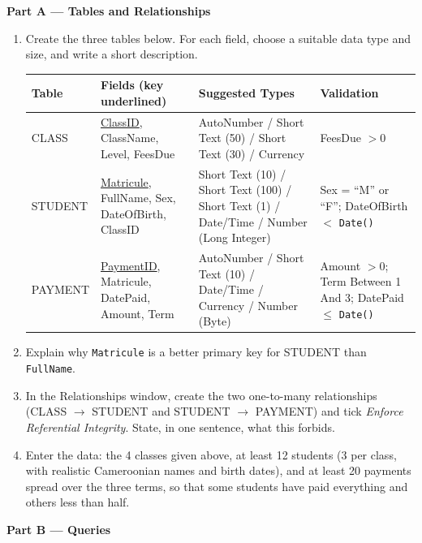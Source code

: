 \documentclass[11pt]{article}
\newcommand{\cle}[1]{{\popxbold\color{popdark}#1}}
\begin{document}
\textbf{Part A — Tables and Relationships}

\begin{enumerate}
\item Create the three tables below. For each field, choose a suitable data type and size, and write a short description.
\begin{center}
\begin{tabularx}{\linewidth}{|l|X|X|X|}
\hline
\rowcolor{popblueL} \textbf{Table} & \textbf{Fields (key underlined)} & \textbf{Suggested Types} & \textbf{Validation} \\
\hline
CLASS & \underline{ClassID}, ClassName, Level, FeesDue & AutoNumber / Short Text (50) / Short Text (30) / Currency & FeesDue $> 0$ \\
\hline
STUDENT & \underline{Matricule}, FullName, Sex, DateOfBirth, ClassID & Short Text (10) / Short Text (100) / Short Text (1) / Date/Time / Number (Long Integer) & Sex = ``M'' or ``F''; DateOfBirth $<$ \texttt{Date()} \\
\hline
PAYMENT & \underline{PaymentID}, Matricule, DatePaid, Amount, Term & AutoNumber / Short Text (10) / Date/Time / Currency / Number (Byte) & Amount $> 0$; Term Between 1 And 3; DatePaid $\le$ \texttt{Date()} \\
\hline
\end{tabularx}
\end{center}

\item Explain why \texttt{Matricule} is a better primary key for STUDENT than \texttt{FullName}.
\item In the Relationships window, create the two \cle{one-to-many} relationships (CLASS $\rightarrow$ STUDENT and STUDENT $\rightarrow$ PAYMENT) and tick \emph{Enforce Referential Integrity}. State, in one sentence, what this forbids.
\item Enter the data: the 4 classes given above, at least 12 students (3 per class, with realistic Cameroonian names and birth dates), and at least 20 payments spread over the three terms, so that some students have paid everything and others less than half.
\end{enumerate}

\textbf{Part B — Queries}
\end{document}
